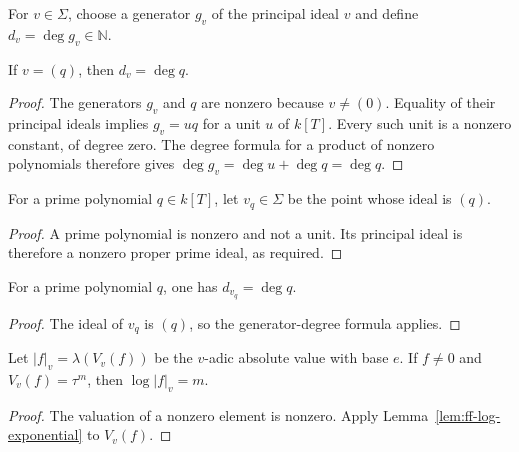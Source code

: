 \begin{definition}\label{def:ff-point-degree}
\leanok
{}
For $v\in\Sigma$, choose a generator $g_v$ of the principal ideal $v$
and define $d_v=\deg g_v\in\mathbb N$.
\end{definition}

\begin{lemma}
\label{lem:ff-generator-degree}
\leanok
{}
If $v=(q)$, then $d_v=\deg q$.
\end{lemma}
\begin{proof}
The generators $g_v$ and $q$ are nonzero because $v\ne(0)$.
Equality of their principal ideals implies $g_v=u q$ for a unit $u$ of
$k[T]$. Every such unit is a nonzero constant, of degree zero.
The degree formula for a product of nonzero polynomials therefore gives
$\deg g_v=\deg u+\deg q=\deg q$.
\end{proof}

\begin{definition}\label{def:ff-prime-point}
\leanok
{}
For a prime polynomial $q\in k[T]$, let $v_q\in\Sigma$ be the point
whose ideal is $(q)$.
\end{definition}
\begin{proof}
A prime polynomial is nonzero and not a unit. Its principal ideal is
therefore a nonzero proper prime ideal, as required.
\end{proof}

\begin{lemma}\label{lem:ff-prime-degree}
\leanok
{}
For a prime polynomial $q$, one has $d_{v_q}=\deg q$.
\end{lemma}
\begin{proof}
The ideal of $v_q$ is $(q)$, so the generator-degree formula applies.
\end{proof}

\begin{lemma}\label{lem:ff-finite-log}
\leanok
{}
Let $|f|_v=\lambda(V_v(f))$ be the $v$-adic absolute value with base
$e$. If $f\ne0$ and $V_v(f)=\tau^m$, then $\log|f|_v=m$.
\end{lemma}
\begin{proof}
The valuation of a nonzero element is nonzero. Apply
Lemma~\ref{lem:ff-log-exponential} to $V_v(f)$.
\end{proof}

